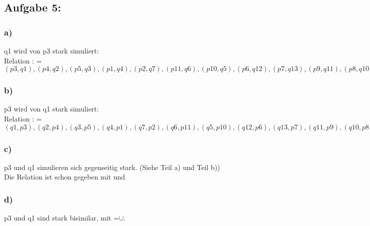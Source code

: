 \documentclass[10pt,a4paper,german,landscape]{article} \usepackage[utf8]{inputenc} %
\begin{document}
\subsection*{Aufgabe 5:}
\subsubsection*{a)}
q1 wird von p3 stark simuliert:\\
Relation : =${(p3,q1),(p4,q2),(p5,q3),(p1,q4),(p2,q7),(p11,q6),(p10,q5),(p6,q12),(p7,q13),(p9,q11),(p8,q10),(p9,q9),(p8,q8)}$
\subsubsection*{b)}
p3 wird von q1 stark simuliert:\\
Relation : =${(q1,p3),(q2,p4),(q3,p5),(q4,p1),(q7,p2),(q6,p11),(q5,p10),(q12,p6),(q13,p7),(q11,p9),(q10,p8),(q9,p9),(q8,p8)}$
\subsubsection*{c)}
p3 und q1 simulieren sich gegenseitig stark. (Siehe Teil a) und Teil b)) \\
Die Relation ist schon gegeben mit  und 
\subsubsection*{d)}
p3 und q1 sind stark bisimilar, mit =$\cup$. 
\end{document}
